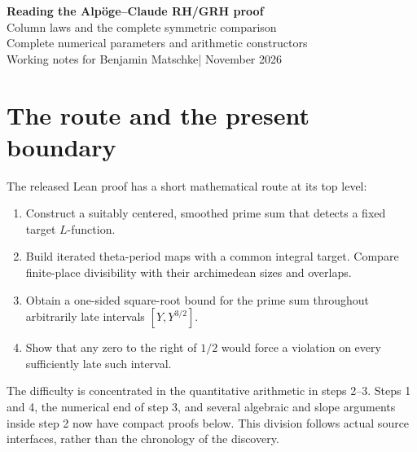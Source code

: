 \documentclass[11pt,a4paper]{article}
\numberwithin{equation}{section}
\theoremstyle{remark}\newtheorem{remark}[theorem]{Remark}
\begin{document}
\begin{center}
{\LARGE\bfseries Reading the Alp\"oge--Claude RH/GRH proof}\\[7pt]
{\large Column laws and the complete symmetric comparison}\\[-1pt]
{\large Complete numerical parameters and arithmetic constructors}\\[8pt]
Working notes for Benjamin Matschke\quad | November 2026
\end{center}

\begingroup\setlength{\fboxsep}{9pt}
\noindent{}\endgroup

\section{The route and the present boundary}

The released Lean proof has a short mathematical route at its top level:
\begin{enumerate}
\item Construct a suitably centered, smoothed prime sum that detects a fixed target $L$-function.
\item Build iterated theta-period maps with a common integral target. Compare finite-place divisibility with their archimedean sizes and overlaps.
\item Obtain a one-sided square-root bound for the prime sum throughout arbitrarily late intervals $[Y,Y^{3/2}]$.
\item Show that any zero to the right of $1/2$ would force a violation on every sufficiently late such interval.
\end{enumerate}
The difficulty is concentrated in the quantitative arithmetic in steps 2--3. Steps 1 and 4, the numerical end of step 3, and several algebraic and slope arguments inside step 2 now have compact proofs below. This division follows actual source interfaces, rather than the chronology of the discovery.
\end{document}
